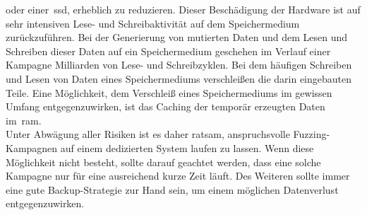 oder einer~\gls{ssd}, erheblich zu reduzieren.
Dieser Beschädigung der Hardware ist auf sehr intensiven Lese- und Schreibaktivität auf dem Speichermedium zurückzuführen.
Bei der Generierung von mutierten Daten und dem Lesen und Schreiben dieser Daten auf ein Speichermedium geschehen im Verlauf
einer Kampagne Milliarden von Lese- und Schreibzyklen.
Bei dem häufigen Schreiben und Lesen von Daten eines Speichermediums verschleißen die darin eingebauten Teile.
Eine Möglichkeit, dem Verschleiß eines Speichermediums im gewissen Umfang entgegenzuwirken, ist das Caching der temporär erzeugten Daten
im~\gls{ram}. \\
\linebreak
Unter Abwägung aller Risiken ist es daher ratsam, anspruchsvolle Fuzzing-Kampagnen auf einem dedizierten System laufen zu lassen.
Wenn diese Möglichkeit nicht besteht, sollte darauf geachtet werden, dass eine solche Kampagne nur für eine ausreichend kurze Zeit läuft.
Des Weiteren sollte immer eine gute Backup-Strategie zur Hand sein, um einem möglichen Datenverlust entgegenzuwirken.